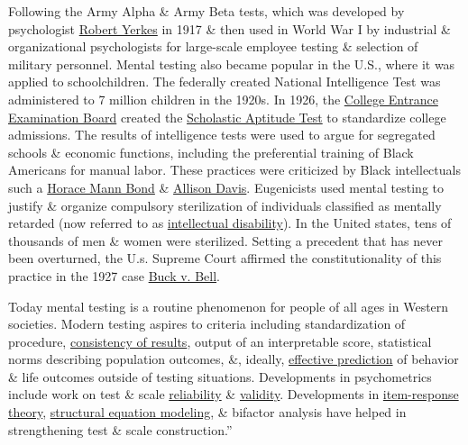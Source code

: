 \documentclass[oneside]{book}
\numberwithin{equation}{section}
\begin{document}
Following the Army Alpha \& Army Beta tests, which was developed by psychologist \href{https://en.wikipedia.org/wiki/Robert_Yerkes}{Robert Yerkes} in 1917 \& then used in World War I by industrial \& organizational psychologists for large-scale employee testing \& selection of military personnel. Mental testing also became popular in the U.S., where it was applied to schoolchildren. The federally created National Intelligence Test was administered to 7 million children in the 1920s. In 1926, the \href{https://en.wikipedia.org/wiki/College_Entrance_Examination_Board}{College Entrance Examination Board} created the \href{https://en.wikipedia.org/wiki/Scholastic_Aptitude_Test}{Scholastic Aptitude Test} to standardize college admissions. The results of intelligence tests were used to argue for segregated schools \& economic functions, including the preferential training of Black Americans for manual labor. These practices were criticized by Black intellectuals such a \href{https://en.wikipedia.org/wiki/Horace_Mann_Bond}{Horace Mann Bond} \& \href{https://en.wikipedia.org/wiki/Allison_Davis_(anthropologist)}{Allison Davis}. Eugenicists used mental testing to justify \& organize compulsory sterilization of individuals classified as mentally retarded (now referred to as \href{https://en.wikipedia.org/wiki/Intellectual_disability}{intellectual disability}). In the United states, tens of thousands of men \& women were sterilized. Setting a precedent that has never been overturned, the U.s. Supreme Court affirmed the constitutionality of this practice in the 1927 case \href{https://en.wikipedia.org/wiki/Buck_v._Bell}{Buck v. Bell}.

Today mental testing is a routine phenomenon for people of all ages in Western societies. Modern testing aspires to criteria including standardization of procedure, \href{https://en.wikipedia.org/wiki/Reliability_(psychometrics)}{consistency of results}, output of an interpretable score, statistical norms describing population outcomes, \&, ideally, \href{https://en.wikipedia.org/wiki/Test_validity}{effective prediction} of behavior \& life outcomes outside of testing situations. Developments in psychometrics include work on test \& scale \href{https://en.wikipedia.org/wiki/Reliability_(statistics)}{reliability} \& \href{https://en.wikipedia.org/wiki/Test_validity}{validity}. Developments in \href{https://en.wikipedia.org/wiki/Item-response_theory}{item-response theory}, \href{https://en.wikipedia.org/wiki/Structural_equation_modeling}{structural equation modeling}, \& bifactor analysis have helped in strengthening test \& scale construction.''
\end{document}
